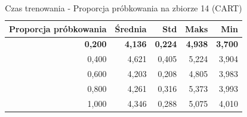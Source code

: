 \begin{table}[htbp]
\centering
\small
\setlength{\tabcolsep}{6pt}
\renewcommand{\arraystretch}{1.2}
\caption{Czas trenowania - Proporcja próbkowania na zbiorze 14 (CART)}
\label{tab:CART_sample_ratio_14_time}
\begin{tabular}{r|r|r|r|r}
\toprule
Proporcja próbkowania & Średnia & Std & Maks & Min \\
\hline
\textbf{0,200} & \textbf{4,136} & \textbf{0,224} & \textbf{4,938} & \textbf{3,700} \\
0,400 & 4,621 & 0,405 & 5,224 & 3,904 \\
0,600 & 4,203 & 0,208 & 4,805 & 3,983 \\
0,800 & 4,261 & 0,316 & 5,373 & 3,993 \\
1,000 & 4,346 & 0,288 & 5,075 & 4,010 \\
\bottomrule
\end{tabular}
\end{table}